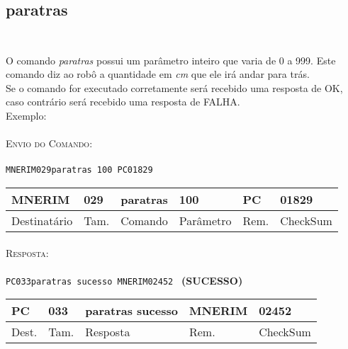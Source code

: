 \documentclass[11pt,	 papera4]{article}
\begin{document}
\subsection*{paratras \\\\}
O comando \textit{paratras} possui um parâmetro inteiro que varia de 0 a 999. 
Este comando diz ao robô a quantidade em \textit{cm} que ele irá andar para trás.\\
Se o comando for executado corretamente será recebido uma resposta de OK, caso contrário será recebido uma resposta de FALHA. \\
\newline
Exemplo: \\\\ \hspace*{0.5cm} 
\textsc{Envio do Comando:} \\\\ \hspace*{2cm}\texttt{MNERIM029paratras 100 PC01829} \\

\begin{table}[h]
	\centering
	\begin{tabular}{p{2cm}p{1cm}p{2cm}p{2cm}p{1cm}p{2cm}}
		\toprule
		MNERIM & 029 & paratras & 100 & PC & 01829 \\
		\midrule	
		Destinatário & Tam. & Comando & Parâmetro & Rem.& CheckSum \\
		\bottomrule
	\end{tabular}
	\label{tab:formatoslatex} %
\end{table}

\paragraph*{\newline\newline}
\hspace*{0.8cm}\textsc{Resposta:} \\\\ \hspace*{2cm}\texttt{PC033paratras sucesso MNERIM02452
} \hspace*{2cm}\textbf{(SUCESSO)}

\begin{table}[h]
	\centering
	\begin{tabular}{p{1cm}p{1cm}p{3cm}p{2cm}p{2cm}}
		\toprule
		PC & 033 &paratras sucesso  & MNERIM & 02452 \\
		\midrule	
		Dest. & Tam. & Resposta & Rem. & CheckSum \\
		\bottomrule
	\end{tabular}
	\label{tab:formatoslatex} %
\end{table}
\end{document}
